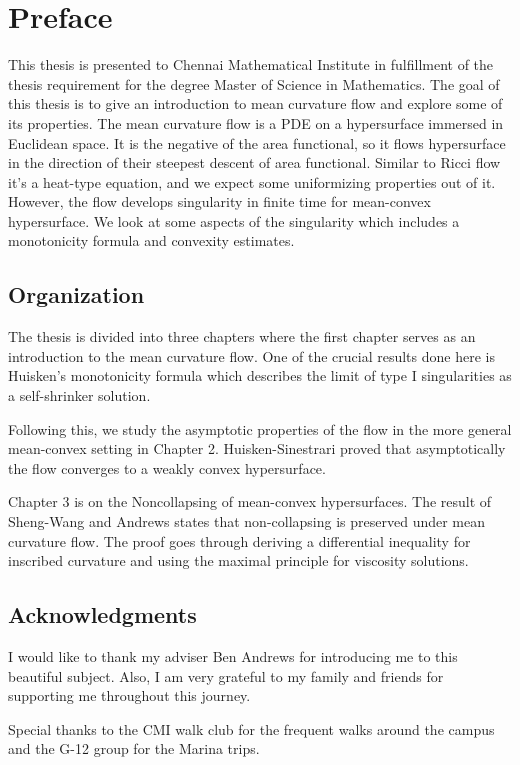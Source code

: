 \chapter{Preface}

      This thesis is presented to Chennai Mathematical Institute in fulfillment of the thesis
      requirement for the degree Master of Science in Mathematics. The goal of this thesis is to give an introduction to mean curvature flow and explore some of its properties. The mean curvature flow is a PDE on a hypersurface immersed in Euclidean space. It is the negative of the area functional, so it flows hypersurface in the direction of their steepest descent of area functional. Similar to Ricci flow it's a heat-type equation, and we expect some uniformizing properties out of it. However, the flow develops singularity in finite time for mean-convex hypersurface. We look at some aspects of the singularity which includes a monotonicity formula and convexity estimates.  %


\section*{Organization}
      
      The thesis is divided into three chapters where the first chapter serves as an introduction to the mean curvature flow. One of the crucial results done here is Huisken's monotonicity formula which describes the limit of type I singularities as a self-shrinker solution.  
      
      Following this, we study the asymptotic properties of the flow in the more general mean-convex setting in Chapter 2. Huisken-Sinestrari proved that asymptotically the flow converges to a weakly convex hypersurface.
      
      Chapter 3 is on the Noncollapsing of mean-convex hypersurfaces. The result of Sheng-Wang and Andrews states that non-collapsing is preserved under mean curvature flow. The proof goes through deriving a differential inequality for inscribed curvature and using the maximal principle for viscosity solutions. 

\section*{Acknowledgments}

I would like to thank my adviser Ben Andrews for introducing me to this beautiful subject. Also, I am very grateful to my family and friends for supporting me throughout this journey.

Special thanks to the CMI walk club for the frequent walks around the campus and the G-12 group for the Marina trips. 